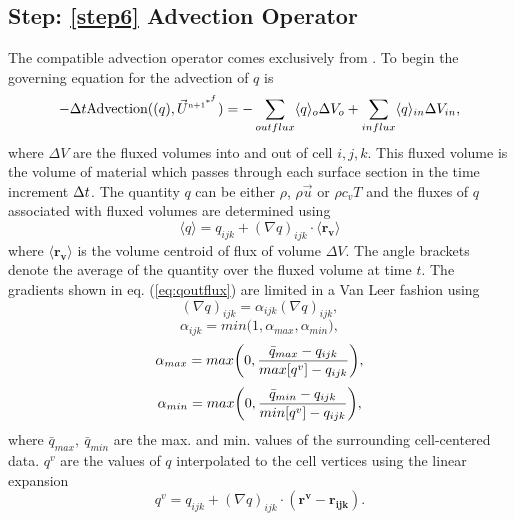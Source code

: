 \documentclass[fleqn]{article}
\begin{document}
{\subsection{Step: \ref{step6} \textsf{Advection Operator}}
The compatible advection operator comes exclusively from
.  To begin the governing equation for the
advection of $q$ is
\begin{equation}
    - \delt \text{Advection}((q), \ustar) = 
-   \sum_{outflux} \langle{q}\rangle_o \Delta{V_o} 
+   \sum_{influx} \langle{q}\rangle_{in} \Delta{V_{in}},
    \label{eq:advect.main}
\end{equation}
%
where $\Delta V$ are the fluxed volumes into and out of cell $i,j,k$.
This fluxed volume is the volume of material which passes through each surface
section in the time increment $\delt$. The quantity $q$ can be either $\rho$,
$\rho \vec{u}$ or $\rho c_v T$ and the fluxes of $q$ associated with fluxed
volumes are determined using
%
\begin{equation}
\label{eq:qoutflux}
    \langle{q}\rangle = q_{ijk} + (\nabla q)_{ijk} \cdot \langle \mathbf{r_{v}} \rangle
\end{equation}
%
where $\mathbf{\langle r_{v} \rangle}$ is the volume centroid of flux of volume
$\Delta V$.  The angle brackets denote the average of the quantity over the
fluxed volume at time $t$.  The gradients shown in eq. (\ref{eq:qoutflux})
are limited in a Van Leer fashion using  \\
%
%
\begin{equation}
    (\nabla q)_{ijk} = \alpha_{ijk}(\nabla q)_{ijk},
\end{equation}
%
%
\begin{equation}
    \alpha_{ijk} = min\biggl( 1, \alpha_{max}, \alpha_{min} \biggr),
\end{equation}
%
%
\begin{equation}
    \alpha_{max} = max\biggl{(} 0, \frac{\bar{q}_{max} - q_{ijk}}{max[q^v] - q_{ijk}}\biggr{)},
\end{equation}
%
%
\begin{equation}
    \alpha_{min} = max\biggl{(} 0, \frac{\bar{q}_{min} - q_{ijk}}{min[q^v] - q_{ijk}}\biggr{)},
\end{equation}
%
%
where $\bar{q}_{max},~\bar{q}_{min}$ are the max. and min. values of the
surrounding cell-centered data.  $q^v$ are the values of $q$ interpolated
to the cell vertices using the linear expansion
%
%
\begin{equation}
    \label{eq:vertex}
    q^v = q_{ijk} + (\nabla q)_{ijk} \cdot  (\mathbf{r^{v} - r_{ijk}} ).
\end{equation}
 \\
 \\
%
}
\end{document}
